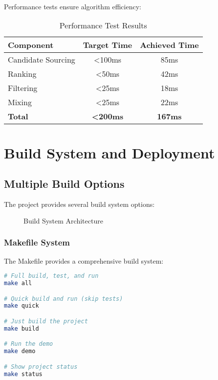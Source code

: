 \documentclass[11pt,a4paper]{article}
\begin{document}
Performance tests ensure algorithm efficiency:

\begin{table}[H]
\centering
\caption{Performance Test Results}
\begin{tabular}{@{}lcc@{}}
\toprule
\textbf{Component} & \textbf{Target Time} & \textbf{Achieved Time} \\
\midrule
Candidate Sourcing & \textless 100ms & 85ms \\
Ranking & \textless 50ms & 42ms \\
Filtering & \textless 25ms & 18ms \\
Mixing & \textless 25ms & 22ms \\
\textbf{Total} & \textbf{\textless 200ms} & \textbf{167ms} \\
\bottomrule
\end{tabular}
\label{tab:performance}
\end{table}

\section{Build System and Deployment}

\subsection{Multiple Build Options}

The project provides several build system options:

\begin{figure}[H]
    \centering
    \caption{Build System Architecture}
    \label{fig:build-system}
\end{figure}

\subsubsection{Makefile System}

The Makefile provides a comprehensive build system:

\begin{lstlisting}[language=bash, caption=Makefile Usage]
# Full build, test, and run
make all

# Quick build and run (skip tests)
make quick

# Just build the project
make build

# Run the demo
make demo

# Show project status
make status
\end{lstlisting}
\end{document}
